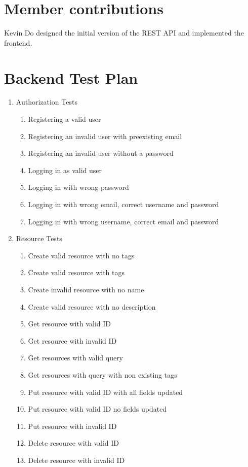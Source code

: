 \documentclass[12pt]{article}
\begin{document}
\section{Member contributions}
Kevin Do designed the initial version of the REST API and implemented the frontend.

\clearpage
\appendix
\section{Backend Test Plan}
\label{appendix:backendtest}
\begin{enumerate}
	\item Authorization Tests
	\begin{enumerate}
		\item Registering a valid user
		\item Registering an invalid user with preexisting email
		\item Registering an invalid user without a password
		\item Logging in as valid user
		\item Logging in with wrong password
		\item Logging in with wrong email, correct username and password
		\item Logging in with wrong username, correct email and password
	\end{enumerate}
	\item Resource Tests
	\begin{enumerate}
		\item Create valid resource with no tags
		\item Create valid resource with tags
		\item Create invalid resource with no name
		\item Create valid resource with no description 
		\item Get resource with valid ID
		\item Get resource with invalid ID
		\item Get resources with valid query
		\item Get resources with query with non existing tags
		\item Put resource with valid ID with all fields updated
		\item Put resource with valid ID no fields updated
		\item Put resource with invalid ID
		\item Delete resource with valid ID
		\item Delete resource with invalid ID

\end{enumerate}
\end{enumerate}
\end{document}
